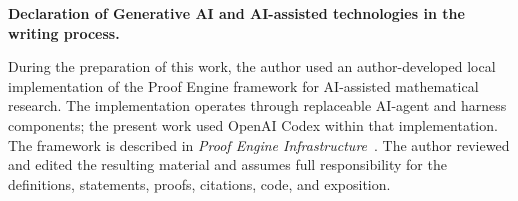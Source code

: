 \documentclass[11pt]{article}
\theoremstyle{definition}
\begin{document}
\begingroup
\footnotesize
\medskip
\noindent\textbf{Declaration of Generative AI and AI-assisted technologies in
the writing process.}\par
During the preparation of this work, the author used an author-developed local
implementation of the Proof Engine framework for AI-assisted mathematical
research.  The implementation operates through replaceable AI-agent and
harness components; the present work used OpenAI Codex within that
implementation.  The framework is described in \emph{Proof Engine
Infrastructure}~\cite{LiProofEngine2026}.  The author reviewed and edited the
resulting material and assumes full responsibility for the definitions,
statements, proofs, citations, code, and exposition.



\endgroup
\end{document}
